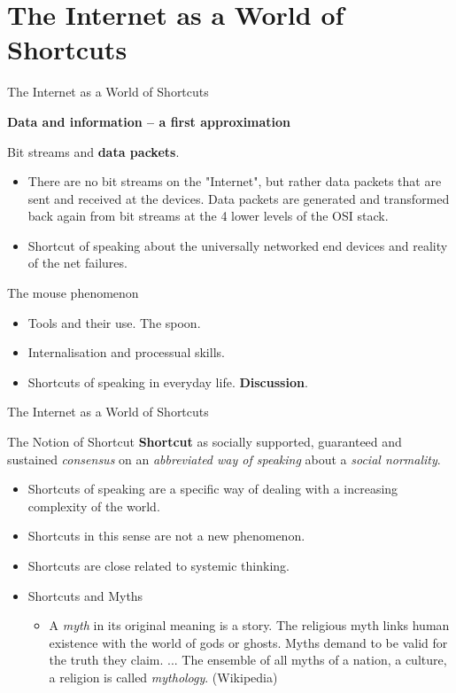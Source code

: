 \documentclass{beamer}
\title{Modelling Sustainable Systems\\ and Semantic Web\\[6pt] Data and
  Information \vskip1em}
\subtitle{Lecture in the Module 10-202-2309\\ for Master Computer Science}
\author{Prof. Dr. Hans-Gert Gräbe\\
\url{http://www.informatik.uni-leipzig.de/~graebe}}
\date{December 2021}
\newcommand{\ueberschrift}[1]{\begin{center}\bf #1\end{center}}
\begin{document}
{
\begin{frame}
  \titlepage
\end{frame}}

\section{The Internet as a World of Shortcuts}
\begin{frame}{The Internet as a World of Shortcuts}
  
\ueberschrift{Data and information -- a first approximation}

Bit streams and \textbf{data packets}.
\begin{itemize}
\item There are no bit streams on the "Internet", but rather data packets that
  are sent and received at the devices.  Data packets are generated and
  transformed back again from bit streams at the 4 lower levels of the OSI
  stack.
\item Shortcut of speaking about the universally networked end devices and
  reality of the net failures.
\end{itemize}
The mouse phenomenon
\begin{itemize}
\item Tools and their use. The spoon.
\item Internalisation and processual skills. 
\item Shortcuts of speaking in everyday life. \textbf{Discussion}.
\end{itemize}\vspace*{2em}
\end{frame}

\begin{frame}{The Internet as a World of Shortcuts}

\begin{block}{The Notion of Shortcut}
  \textbf{Shortcut} as socially supported, guaranteed and sustained
  \emph{consensus} on an \emph{abbreviated way of speaking} about a
  \emph{social normality}.
\end{block}
\begin{itemize}
\item Shortcuts of speaking are a specific way of dealing with a increasing
  complexity of the world.
\item Shortcuts in this sense are not a new phenomenon.
\item Shortcuts are close related to systemic thinking.
\item Shortcuts and Myths
  \begin{itemize}
  \item A \emph{myth} in its original meaning is a story. The religious myth
    links human existence with the world of gods or ghosts. Myths demand to be
    valid for the truth they claim. ... The ensemble of all myths of a nation,
    a culture, a religion is called \emph{mythology}.  (Wikipedia)
  \end{itemize}
\end{itemize}
\end{frame}
\end{document}
